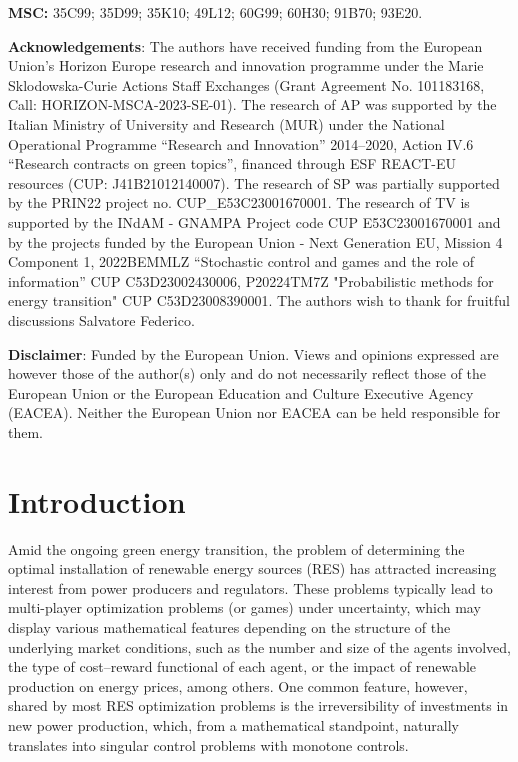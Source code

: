 \documentclass[10pt]{article}
\numberwithin{equation}{section}
\theoremstyle{plain}
\numberwithin{theorem}{section}
\theoremstyle{definition}
\newcommand{\<}{\langle}
\renewcommand{\>}{\rangle}
\renewcommand{\(}{\left(}
\renewcommand{\)}{\right)}
\begin{document}
\noindent \textbf{MSC:} 35C99; 35D99; 35K10; 49L12; 60G99; 60H30; 91B70; 93E20. \\ \noindent

{\noindent\textbf{Acknowledgements}: The authors have received funding from the European Union’s Horizon Europe research and innovation programme under the Marie Sklodowska-Curie Actions Staff Exchanges (Grant Agreement No. 101183168, Call: HORIZON-MSCA-2023-SE-01). The research of AP was supported by the Italian Ministry of University and Research (MUR) under the National Operational Programme “Research and Innovation” 2014–2020, Action IV.6 “Research contracts on green topics”, financed through ESF REACT-EU resources (CUP: J41B21012140007).  
The research of SP was partially supported by the PRIN22 project no. CUP\_E53C23001670001. 
{The research of TV is supported by the INdAM - GNAMPA Project code CUP E53C23001670001 and by the projects funded by the European Union - Next Generation EU, Mission 4 Component 1, 2022BEMMLZ ``Stochastic control and games and the role of information'' CUP C53D23002430006, P20224TM7Z "Probabilistic methods for energy transition"  CUP C53D23008390001. 
The authors wish to thank for fruitful discussions Salvatore Federico.
}

\vspace{5pt}

{\noindent\textbf{Disclaimer}: Funded by the European Union. Views and opinions expressed are however those of the author(s) only and do not necessarily reflect those of the European Union or the European Education and Culture Executive Agency (EACEA). Neither the European Union nor EACEA can be held responsible for them.}



\tiny
\tableofcontents
\normalsize

\section{Introduction}

Amid the ongoing green energy transition, the problem of determining the optimal installation of renewable energy sources (RES) has attracted increasing interest from power producers and regulators. These problems typically lead to multi-player optimization problems (or games) under uncertainty, which may display various mathematical features depending on the structure of the underlying market conditions, such as the number and size of the agents involved, the type of cost–reward functional of each agent, or the impact of renewable production on energy prices, among others. One common feature, however, shared by most RES optimization problems is the irreversibility of investments in new power production, which, from a mathematical standpoint, naturally translates into singular control problems with monotone controls.

}
\end{document}
